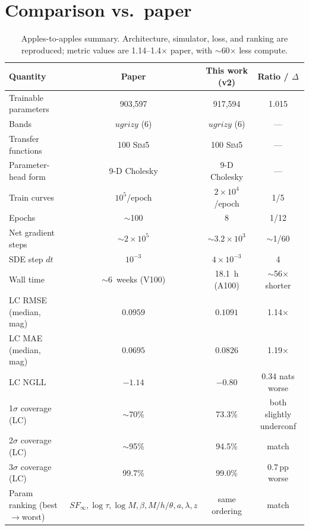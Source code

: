 \documentclass[11pt]{article}
\begin{document}
\section{Comparison vs.\ paper}

\begin{table}[h]\centering
\begin{tabular}{lccc}
\toprule
Quantity                 & Paper & This work (v2) & Ratio / $\Delta$ \\
\midrule
Trainable parameters     & 903{,}597         & 917{,}594        & 1.015 \\
Bands                    & $ugrizy$ (6)      & $ugrizy$ (6)     & --- \\
Transfer functions       & 100 \textsc{Sim5} & 100 \textsc{Sim5} & --- \\
Parameter-head form      & 9-D Cholesky      & 9-D Cholesky     & --- \\
Train curves             & $10^5$/epoch      & $2\times10^4$/epoch & 1/5 \\
Epochs                   & $\sim$100         & 8                & 1/12 \\
Net gradient steps       & $\sim 2\times10^5$ & $\sim 3.2\times10^3$ & $\sim$1/60 \\
SDE step $dt$            & $10^{-3}$         & $4\times10^{-3}$ & 4 \\
Wall time                & $\sim$6~weeks (V100) & 18.1~h (A100) & $\sim$56$\times$ shorter \\
\midrule
LC RMSE (median, mag)    & $0.0959$          & $0.1091$         & 1.14$\times$ \\
LC MAE (median, mag)     & $0.0695$          & $0.0826$         & 1.19$\times$ \\
LC NGLL                  & $-1.14$           & $-0.80$          & 0.34 nats worse \\
1$\sigma$ coverage (LC)  & $\sim$70\%        & 73.3\%           & both slightly underconf \\
2$\sigma$ coverage (LC)  & $\sim$95\%        & 94.5\%           & match \\
3$\sigma$ coverage (LC)  & 99.7\%            & 99.0\%           & 0.7\,pp worse \\
Param ranking (best$\to$worst) & $SF_\infty,\log\tau,\log M,\beta,M/h/\theta,a,\lambda,z$ & same ordering & match \\
\bottomrule
\end{tabular}
\caption{Apples-to-apples summary.  Architecture, simulator, loss, and
  ranking are reproduced; metric values are 1.14--1.4$\times$ paper, with
  $\sim$60$\times$ less compute.}
\label{tab:cmp}
\end{table}
\end{document}
